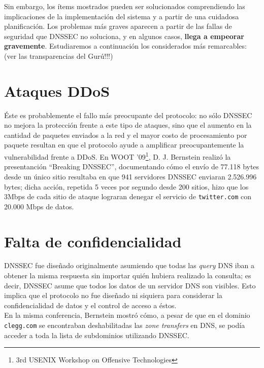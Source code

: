 Sin embargo, los \'items mostrados pueden ser solucionados comprendiendo las implicaciones de la implementaci\'on del sistema y a partir de una cuidadosa planificaci\'on. Los problemas m\'as graves aparecen a partir de las fallas de seguridad que DNSSEC no soluciona, y en algunos casos, \textbf{llega a empeorar gravemente}. Estudiaremos a continuaci\'on los considerados m\'as remarcables: (ver las transparencias del Gur\'u!!!)

\section{Ataques DDoS}
\'Este es probablemente el fallo m\'as preocupante del protocolo: no s\'olo DNSSEC no mejora la protecci\'on frente a este tipo de ataques, sino que el aumento en la cantidad de paquetes enviados a la red y el mayor costo de procesamiento por paquete resultan en que el protocolo ayude a amplificar preocupantemente la vulnerabilidad frente a DDoS. En WOOT '09\footnote{3rd USENIX Workshop on Offensive Technologies}, D. J. Bernstein realiz\'o la presentanci\'on "`Breaking DNSSEC"'\cite{break09}, documentando c\'omo el env\'io de 77.118 bytes desde un \'unico sitio resultaba en que 941 servidores DNSSEC enviaran 2.526.996 bytes; dicha acci\'on, repetida 5 veces por segundo desde 200 sitios, hizo que los 3Mbps de cada sitio de ataque lograran denegar el servicio de \texttt{twitter.com} con 20.000 Mbps de datos.

\section{Falta de confidencialidad}
DNSSEC fue dise\~nado originalmente asumiendo que todas las \textit{query} DNS iban a obtener la misma respuesta sin importar qui\'en hubiera realizado la consulta; es decir, DNSSEC asume que todos los datos de un servidor DNS son visibles. Esto implica que el protocolo no fue dise\~nado ni siquiera para considerar la confidencialidad de datos y el control de acceso a \'estos.\\
En la misma conferencia, Bernstein mostr\'o c\'omo, a pesar de que en el dominio \texttt{clegg.com} se encontraban deshabilitadas las \textit{zone transfers} en DNS, se pod\'ia acceder a toda la lista de subdominios utilizando DNSSEC.

